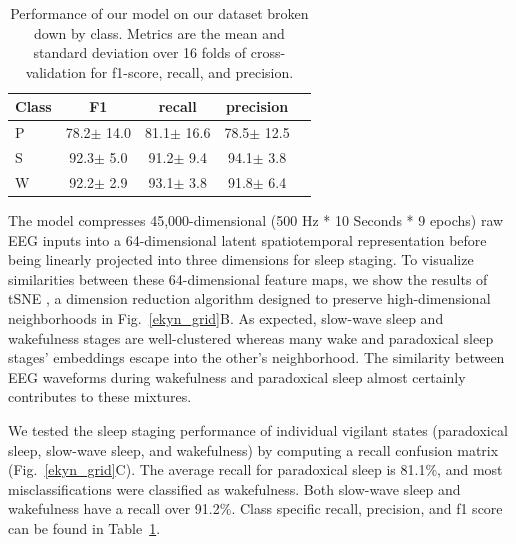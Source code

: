 \documentclass[pdflatex,sn-mathphys-num]{sn-jnl}%
\theoremstyle{thmstyleone}%
\theoremstyle{thmstyletwo}%
\theoremstyle{thmstylethree}%
\newcommand{\ekynfscorep}{78.2}
\newcommand{\ekynfscores}{92.3}
\newcommand{\ekynfscorew}{92.2}
\newcommand{\ekynprecisionp}{78.5}
\newcommand{\ekynprecisions}{94.1}
\newcommand{\ekynprecisionw}{91.8}
\newcommand{\ekynrecallp}{81.1}
\newcommand{\ekynrecalls}{91.2}
\newcommand{\ekynrecallw}{93.1}
\newcommand{\ekynfscorepstd}{14.0}
\newcommand{\ekynfscoresstd}{5.0}
\newcommand{\ekynfscorewstd}{2.9}
\newcommand{\ekynprecisionpstd}{12.5}
\newcommand{\ekynprecisionsstd}{3.8}
\newcommand{\ekynprecisionwstd}{6.4}
\newcommand{\ekynrecallpstd}{16.6}
\newcommand{\ekynrecallsstd}{9.4}
\newcommand{\ekynrecallwstd}{3.8}
\begin{document}
\begin{table}[ht]
    \caption{Performance of our model on our dataset broken down by class. Metrics are the mean and standard deviation over 16 folds of cross-validation for f1-score, recall, and precision.}
    \label{kyna_table}
    \vskip 0.15in
    \begin{centering}
    \begin{small}
    \begin{sc}
    \begin{tabular}{lcccr}
    \toprule
    Class & F1 & recall & precision \\
    \midrule
    P & \ekynfscorep $\pm$ \ekynfscorepstd & \ekynrecallp $\pm$ \ekynrecallpstd & \ekynprecisionp $\pm$ \ekynprecisionpstd\\
    S & \ekynfscores $\pm$ \ekynfscoresstd & \ekynrecalls $\pm$ \ekynrecallsstd & \ekynprecisions $\pm$ \ekynprecisionsstd\\
    W & \ekynfscorew $\pm$ \ekynfscorewstd & \ekynrecallw $\pm$ \ekynrecallwstd & \ekynprecisionw $\pm$ \ekynprecisionwstd\\
    \bottomrule
    \end{tabular}
    \end{sc}
    \end{small}
    \end{centering}
    \vskip -0.1in
\end{table}

The model compresses 45,000-dimensional  (500 Hz * 10 Seconds * 9 epochs) raw EEG inputs into a 64-dimensional  latent spatiotemporal representation before being linearly projected into three dimensions  for sleep staging. To visualize similarities between these 64-dimensional feature maps, we show the results of tSNE \cite{maaten_visualizing_2008}, a dimension reduction algorithm designed to preserve high-dimensional neighborhoods in Fig.~\ref{ekyn_grid}B. As expected, slow-wave sleep and wakefulness stages are well-clustered whereas many wake and paradoxical sleep stages' embeddings escape into the other's neighborhood. The similarity between EEG waveforms during wakefulness and paradoxical sleep almost certainly contributes to these mixtures.

We tested the sleep staging performance of individual vigilant states (paradoxical sleep, slow-wave sleep, and wakefulness) by computing a recall confusion matrix (Fig.~\ref{ekyn_grid}C). The average recall for paradoxical sleep is \ekynrecallp\%, and most misclassifications were classified as wakefulness. Both slow-wave sleep and wakefulness have a recall over \ekynrecalls\%. Class specific recall, precision, and f1 score can be found in Table~\ref{kyna_table}.
\end{document}
